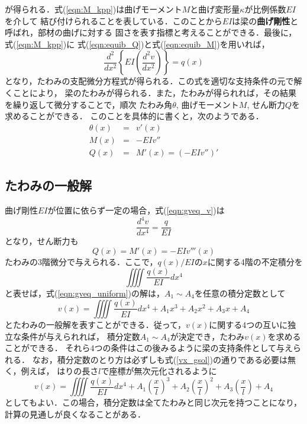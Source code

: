 \documentclass[10pt,a4j]{jbook}
\begin{document}
が得られる．式(\ref{eqn:M_kpp})は曲げモーメント$M$と曲げ変形量$\kappa$が比例係数$EI$を介して
結び付けられることを表している．このことから$EI$は梁の{\bf 曲げ剛性}と呼ばれ，部材の曲げに対する
固さを表す指標と考えることができる．最後に，式(\ref{eqn:M_kpp})に
式(\ref{eqn:equib_Q})と式(\ref{eqn:equib_M})を用いれば，
\begin{equation}
	\frac{d^2}{dx^2}\left\{ EI \left(\frac{d^2v}{dx^2}\right)\right\}=q(x)
	\label{eqn:gveq_v}
\end{equation}
となり，たわみの支配微分方程式が得られる．この式を適切な支持条件の元で解くことにより，
梁のたわみが得られる．また，たわみが得られれば，その結果を繰り返して微分することで，順次
たわみ角$\theta$, 曲げモーメント$M$, せん断力$Q$を求めることができる．
このことを具体的に書くと，次のようである．
\begin{eqnarray}
	\theta(x) &=& v'(x) \\
	M(x) &=& -EIv '' \\
	Q(x) &=& M'(x) = \left(-EIv''\right)' 
\end{eqnarray}
\subsection{たわみの一般解}
曲げ剛性$EI$が位置に依らず一定の場合，式(\ref{eqn:gveq_v})は
\begin{equation}
	\frac{d^4v}{dx^4}=\frac{q}{EI}
	\label{eqn:gveq_uniform}
\end{equation}
となり，せん断力も
\begin{equation}
	Q(x)=M'(x)=-EIv'''(x)
\end{equation}
たわみの3階微分で与えられる．ここで，$q(x)/EI$の$x$に関する4階の不定積分を
\[
	\iiiint \frac{q(x)}{EI}dx^4
\]
と表せば，式(\ref{eqn:gveq_uniform})の解は，$A_1\sim A_4$を任意の積分定数として
\begin{equation}
	v(x)= 
	\iiiint \frac{q(x)}{EI}dx^4
	+A_1 x^3 +A_2x^2 + A_3x + A_4
	\label{eqn:vx_gsol}
\end{equation}
とたわみの一般解を表すことができる．従って，$v(x)$に関する4つの互いに独立な条件が与えられれば，
積分定数$A_1\sim A_4$が決定でき，たわみ$v(x)$を求めることができる．
それら4つの条件はこの後みるように梁の支持条件として与えられる．
なお，積分定数のとり方は必ずしも式(\ref{vx_gsol})の通りである必要は無く，例えば，
はりの長さ$l$で座標が無次元化されるように
\begin{equation}
	v(x)= 
	\iiiint \frac{q(x)}{EI}dx^4
	+A_1 \left(\frac{x}{l}\right)^3 
	+A_2 \left(\frac{x}{l}\right)^2 
	+A_3 \left(\frac{x}{l}\right)
	+A_4
	\label{eqn:vx_gsol}
\end{equation}
としてもよい．この場合，積分定数は全てたわみと同じ次元を持つことになり，
計算の見通しが良くなることがある．
\end{document}
